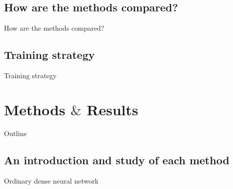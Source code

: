 \documentclass[UKenglish]{beamer}
\begin{document}
\subsection{How are the methods compared?}
\begin{frame}{How are the methods compared?}

\end{frame}

\subsection{Training strategy}
\begin{frame}{Training strategy}
 
\end{frame}


\section{Methods $\&$ Results}
\begin{frame}{Outline}
    \tableofcontents[currentsection]
\end{frame}

\subsection*{An introduction and study of each method}


\begin{frame}{Ordinary dense neural network}
    
\end{frame}
\end{document}
